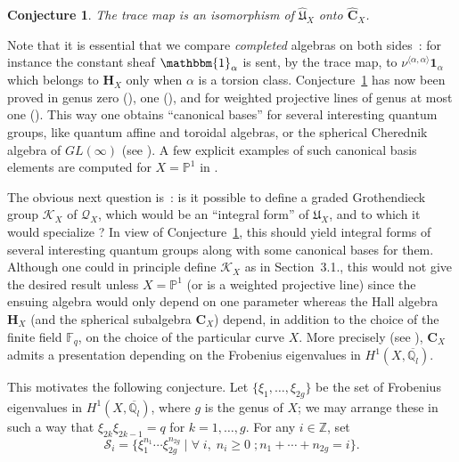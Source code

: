 \documentclass[a4paper,10pt]{amsart}
\def\Z{\mathbb{Z}}
\def\a{\alpha}
\def\qlb{\overline{\mathbb{Q}_l}}
\def\fq{\mathbb{F}_q}
\newtheorem{conj}[theo]{Conjecture}
\numberwithin{equation}{section}
\begin{document}
\vspace{.1in}

\begin{conj}\label{C:conj2} The trace map is an isomorphism of $\widehat{\mathfrak{U}}_X$ onto $\widehat{\mathbf{C}}_X$.
\end{conj}

\vspace{.1in}

Note that it is essential that we compare \textit{completed} algebras on both sides~: for instance the constant sheaf $\mathbbm{1}_{\a}$ is sent, by the trace map, to $\nu^{\langle \a, \a \rangle} \mathbf{1}_{\a}$ which belongs to $\mathbf{H}_X$ only when $\a$ is a torsion class. Conjecture~\ref{C:conj2} has now been proved in genus zero (\cite{Laumon}), one (\cite{Scano}), and for weighted projective lines of genus at most one (\cite{SInvent}). This way one obtains ``canonical bases'' for several interesting quantum groups, like quantum affine and toroidal algebras, or the spherical Cherednik algebra of $GL(\infty)$ (see \cite[Lecture 4.]{Trieste} ). A few explicit examples of such canonical basis elements are computed for $X=\mathbb{P}^1$ in \cite[Section~12]{SInvent}.

\vspace{.2in}

The obvious next question is~: is it possible to define a graded Grothendieck group $\mathcal{K}_X$ of $\mathcal{Q}_X$, which would be an ``integral form'' of $\mathfrak{U}_X$, and to which it would specialize ? In view of Conjecture~\ref{C:conj2}, this should yield integral forms of several interesting quantum groups along with some canonical bases for them. Although one could in principle define $\mathcal{K}_X$ as in Section~3.1., this would not give the desired result unless $X=\mathbb{P}^1$ (or is a weighted projective line) since the ensuing algebra would only depend on one parameter whereas the Hall algebra $\mathbf{H}_X$ (and the spherical subalgebra $\mathbf{C}_X$) depend, in addition to the choice of the finite field $\fq$, on the choice of the particular curve $X$. More precisely (see \cite[Lecture~4]{Trieste}), $\mathbf{C}_X$ admits a presentation depending on the Frobenius eigenvalues in $H^1(X,\qlb)$. 

This motivates the following conjecture. Let $\{\xi_1, \ldots, \xi_{2g}\}$ be the set of Frobenius eigenvalues in $H^1(X,\qlb)$, where $g$ is the genus of $X$; we may arrange these in such a way that $\xi_{2k} \xi_{2k-1}=q$ for $k=1, \ldots, g$.
For any $i \in \Z$, set
$$\mathcal{S}_i=\{\xi_1^{n_1} \cdots \xi_{2g}^{n_{2g}}\;|\;\forall\;i,\; n_i \geq 0 \; ; n_1+\cdots + n_{2g}=i\}.$$
\end{document}

